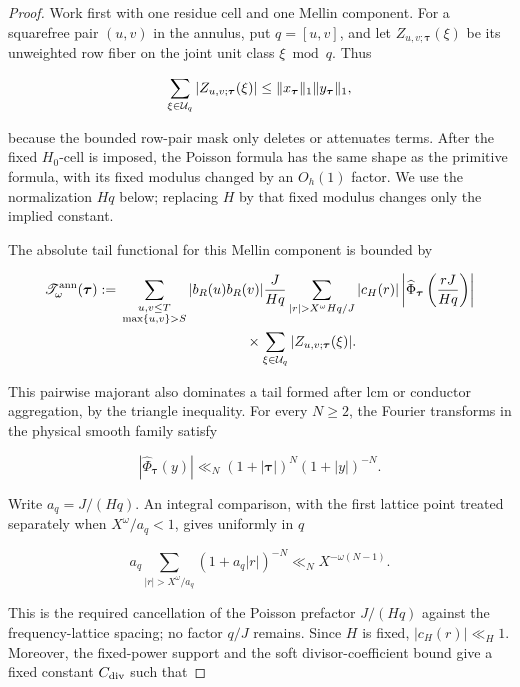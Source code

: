 \begin{proof}
Work first with one residue cell and one Mellin component.  For a
squarefree pair \((u,v)\) in the annulus, put \(q=[u,v]\), and let
\(Z_{u,v;\boldsymbol\tau}(\xi)\) be its unweighted row fiber on the
joint unit class \(\xi\bmod q\).  Thus

\begin{equation}
 \sum_{\xi\in\mathcal U_q}
 |Z_{u,v;\boldsymbol\tau}(\xi)|
 \le
 \|x_{\boldsymbol\tau}\|_1
 \|y_{\boldsymbol\tau}\|_1,
 \label{eq:tpc26-tail-row-fiber-mass}
\end{equation}

because the bounded row-pair mask only deletes or attenuates terms.
After the fixed \(H_0\)-cell is imposed, the Poisson formula has the
same shape as the primitive formula, with its fixed modulus changed by
an \(O_h(1)\) factor.  We use the normalization \(Hq\) below; replacing
\(H\) by that fixed modulus changes only the implied constant.

The absolute tail functional for this Mellin component is bounded by

\begin{align}
 \mathscr T^{\rm ann}_{\omega}(\boldsymbol\tau)
 :={}&
 \sum_{\substack{u,v\le T\\\max\{u,v\}>S}}
 |b_R(u)b_R(v)|\frac{J}{Hq}
 \sum_{|r|>X^\omega Hq/J}|c_H(r)|
 \left|
 \widehat\Phi_{\boldsymbol\tau}
 \left(\frac{rJ}{Hq}\right)
 \right|
 \notag\\
 &\hspace{9em}\times
 \sum_{\xi\in\cU_q}
 |Z_{u,v;\boldsymbol\tau}(\xi)|.
 \label{eq:tpc26-physical-tail-functional}
\end{align}

This pairwise majorant also dominates a tail formed after lcm or
conductor aggregation, by the triangle inequality.  For every
\(N\ge2\), the Fourier transforms in the physical smooth family satisfy

\[
 |\widehat\Phi_{\boldsymbol\tau}(y)|
 \ll_N(1+|\boldsymbol\tau|)^N(1+|y|)^{-N}.
\]

Write \(a_q=J/(Hq)\).  An integral comparison, with the first lattice
point treated separately when \(X^\omega/a_q<1\), gives uniformly in
\(q\)

\begin{equation}
 a_q
 \sum_{|r|>X^\omega/a_q}
 (1+a_q|r|)^{-N}
 \ll_N X^{-\omega(N-1)}.
 \label{eq:tpc26-tail-lattice-cancellation}
\end{equation}

This is the required cancellation of the Poisson prefactor
\(J/(Hq)\) against the frequency-lattice spacing; no factor \(q/J\)
remains.  Since \(H\) is fixed, \(|c_H(r)|\ll_H1\).  Moreover, the
fixed-power support and the soft divisor-coefficient bound give a fixed
constant \(C_{\rm div}\) such that


\end{proof}
